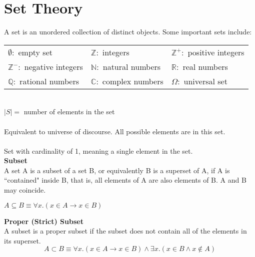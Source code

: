 \documentclass{article}
\numberwithin{theorem}{subsection}
\numberwithin{theorem}{subsubsection}
\theoremstyle{definition}
\numberwithin{definition}{subsection}
\numberwithin{definition}{subsubsection}
\begin{document}
\section{Set Theory}
A set is an unordered collection of distinct objects. Some important sets include:

\begin{table}[H]
    \centering
    \begin{tabular}{l l l}
         $\emptyset : $ empty set & $\mathbb{Z}:$ integers & $\mathbb{Z}^{+}:$ positive integers \\
         $\mathbb{Z}^{-}:$ negative integers & $\mathbb{N}:$ natural numbers & $\mathbb{R}:$ real numbers \\
         $\mathbb{Q}:$ rational numbers & $\mathbb{C}:$ complex numbers & $\Omega:$ universal set
    \end{tabular}
    \label{tab:my_label}
\end{table}

 \\
\indent $|S| = $ number of elements in the set \\

 \\
\indent Equivalent to universe of discourse. All possible elements are in this set.\\

 \\
\indent Set with cardinality of 1, meaning a single element in the set.\\

\noindent \textbf{Subset} \\
\indent A set A is a subset of a set B, or equivalently B is a superset of A, if A is ``contained" inside B, that is, all elements of A are also elements of B. A and B may coincide.
\begin{center}
    $A \subseteq B \equiv \forall x.(x \in A \rightarrow x \in B)$\\    
\end{center}

\noindent \textbf{Proper (Strict) Subset} \\
\indent A subset is a proper subset if the subset does not contain all of the elements in its superset.
\begin{equation*}
    A \subset B \equiv \forall x.(x \in A \rightarrow x \in B) \land \exists x.(x \in B \land x \notin A)   
\end{equation*}
\end{document}
